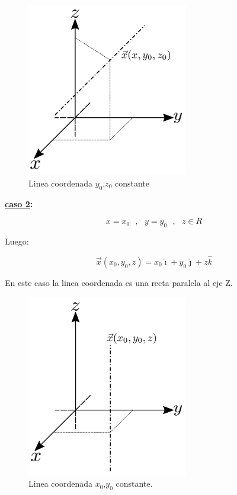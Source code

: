 \documentclass[12pt]{report}
\begin{document}
\begin{figure}[H]
	\centering
	\includegraphics[width=7cm]{figura3.png}
	\caption{ Linea coordenada $y_0$,$z_0$ constante}
	\label{fig.1}
\end{figure}

 
\textbf{\underline{caso 2}:}

\begin{equation} \nonumber
x = x_0 \ \ \ ,\ \ \ y= y_0 \ \ \ ,  \ \ \ z \in R
\end{equation}
 
 Luego:
 
 \begin{equation} \nonumber
 \vec{x}(x_0,y_0,z)= x_0\hat{\imath} + y_0 \hat{\jmath} + z \hat{k}
 \end{equation}

En este caso la linea coordenada es una recta paralela al eje Z. \\


\begin{figure}
	\centering
	\includegraphics[width=7cm]{figura4.png}
	\caption{ Linea coordenada $x_0$,$y_0$ constante.}
	\label{fig.1}
\end{figure}
\end{document}

